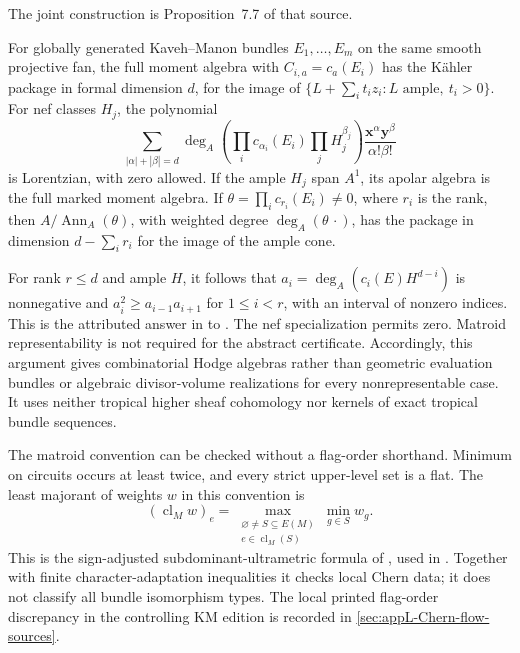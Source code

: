 The joint construction is Proposition~7.7 of that source.
\begin{theorem}
\label{thm:appG-tropical-Chern-moments}
For globally generated Kaveh--Manon bundles $E_1,\ldots,E_m$
on the same smooth projective fan, the full moment algebra with
$C_{i,a}=c_a(E_i)$ has the K\"ahler package in formal dimension
$d$, for the image of $\{L+\sum_i t_i z_i:L\text{ ample},\ t_i>0\}$.
For nef classes $H_j$, the polynomial
\[
 \sum_{|\alpha|+|\beta|=d}
 \deg_A\left(\prod_i c_{\alpha_i}(E_i)\prod_jH_j^{\beta_j}\right)
       \frac{\mathbf x^\alpha\mathbf y^\beta}{\alpha!\beta!}
\tag{G.29}\label{eq:appG-tropical-Chern-polynomial}
\]
is Lorentzian, with zero allowed. If the ample $H_j$ span $A^1$,
its apolar algebra is the full marked moment algebra. If
$\theta=\prod_i c_{r_i}(E_i)\ne0$, where $r_i$ is the rank,
then $A/\operatorname{Ann}_A(\theta)$, with weighted degree
$\deg_A(\theta\,\cdot)$, has the package in dimension
$d-\sum_i r_i$ for the image of the ample cone.
\end{theorem}

For rank $r\leq d$ and ample $H$, it follows that
$a_i=\deg_A(c_i(E)H^{d-i})$ is nonnegative and
$a_i^2\geq a_{i-1}a_{i+1}$ for $1\leq i<r$, with an interval
of nonzero indices. This is the attributed answer in
\cite[Corollary~7.8]{NguyenDangWang26ChernFlowV4} to
\cite[Conjecture~1.7]{KavehManon24TropicalBundlesV2}.
The nef specialization permits zero. Matroid representability
is not required for the abstract certificate. Accordingly, this
argument gives combinatorial Hodge algebras rather than geometric
evaluation bundles or algebraic divisor-volume realizations for
every nonrepresentable case. It uses neither tropical higher
sheaf cohomology nor kernels of exact tropical bundle sequences.

The matroid convention can be checked without a flag-order
shorthand. Minimum on circuits occurs at least twice, and every
strict upper-level set is a flat. The least majorant of weights
$w$ in this convention is
\[
 (\operatorname{cl}_M w)_e
   =\max_{\substack{\varnothing\ne S\subseteq E(M)\\
                    e\in\operatorname{cl}_M(S)}}\min_{g\in S}w_g.
\tag{G.30}\label{eq:appG-matroid-weight-closure}
\]
This is the sign-adjusted subdominant-ultrametric formula of
\cite{Ardila04UltrametricsV1}, used in
\cite[Proposition~7.10]{NguyenDangWang26ChernFlowV4}.
Together with finite character-adaptation inequalities it checks
local Chern data; it does not classify all bundle isomorphism types.
The local printed flag-order discrepancy in the controlling KM
edition is recorded in \cref{sec:appL-Chern-flow-sources}.

